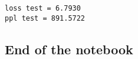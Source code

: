 \documentclass[10pt]{article}
\begin{document}
    \begin{Verbatim}[commandchars=\\\{\}]
loss test = 6.7930
ppl test = 891.5722
    \end{Verbatim}

    \hypertarget{end-of-the-notebook}{%
\subsection{End of the notebook}\label{end-of-the-notebook}}


    
    
    
\end{document}
